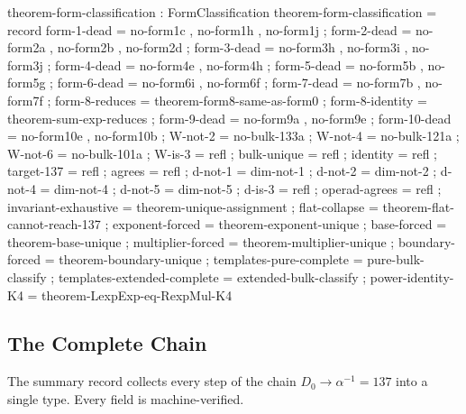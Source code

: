 \documentclass[11pt,a4paper]{article}
\begin{document}
\begin{code}
theorem-form-classification : FormClassification
theorem-form-classification = record
  { form-1-dead   = no-form1c , no-form1h , no-form1j
  ; form-2-dead   = no-form2a , no-form2b , no-form2d
  ; form-3-dead   = no-form3h , no-form3i , no-form3j
  ; form-4-dead   = no-form4e , no-form4h
  ; form-5-dead   = no-form5b , no-form5g
  ; form-6-dead   = no-form6i , no-form6f
  ; form-7-dead   = no-form7b , no-form7f
  ; form-8-reduces = theorem-form8-same-as-form0
  ; form-8-identity = theorem-sum-exp-reduces
  ; form-9-dead   = no-form9a , no-form9e
  ; form-10-dead  = no-form10e , no-form10b
  ; W-not-2       = no-bulk-133a
  ; W-not-4       = no-bulk-121a
  ; W-not-6       = no-bulk-101a
  ; W-is-3        = refl
  ; bulk-unique    = refl
  ; identity       = refl
  ; target-137     = refl
  ; agrees         = refl
  ; d-not-1        = dim-not-1
  ; d-not-2        = dim-not-2
  ; d-not-4        = dim-not-4
  ; d-not-5        = dim-not-5
  ; d-is-3         = refl
  ; operad-agrees  = refl
  ; invariant-exhaustive = theorem-unique-assignment
  ; flat-collapse     = theorem-flat-cannot-reach-137
  ; exponent-forced   = theorem-exponent-unique
  ; base-forced       = theorem-base-unique
  ; multiplier-forced = theorem-multiplier-unique
  ; boundary-forced   = theorem-boundary-unique
  ; templates-pure-complete = pure-bulk-classify
  ; templates-extended-complete = extended-bulk-classify
  ; power-identity-K4 = theorem-LexpExp-eq-RexpMul-K4
  }
\end{code}

\subsection{The Complete Chain}

The summary record collects every step of the chain $D_0 \to \alpha^{-1} = 137$
into a single type. Every field is machine-verified.
\end{document}
